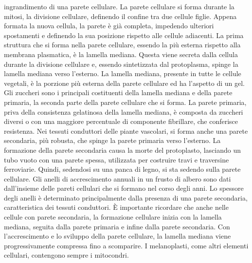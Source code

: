 \documentclass[11pt, a4paper]{article}
\begin{document}
\begin{spacing}{1.15}
ingrandimento di una parete cellulare. La parete cellulare si forma durante la mitosi, la divisione cellulare, definendo il confine tra due cellule figlie. Appena formata la nuova cellula, la parete è già completa, impedendo ulteriori spostamenti e definendo la sua posizione rispetto alle cellule adiacenti. La prima struttura che si forma nella parete cellulare, essendo la più esterna rispetto alla membrana plasmatica, è la lamella mediana. Questa viene secreta dalla cellula durante la divisione cellulare e, essendo sintetizzata dal protoplasma, spinge la lamella mediana verso l'esterno. La lamella mediana, presente in tutte le cellule vegetali, è la porzione più esterna della parete cellulare ed ha l'aspetto di un gel. Gli zuccheri sono i principali costituenti della lamella mediana e della parete primaria, la seconda parte della parete cellulare che si forma. La parete primaria, priva della consistenza gelatinosa della lamella mediana, è composta da zuccheri diversi o con una maggiore percentuale di componente fibrillare, che conferisce resistenza. Nei tessuti conduttori delle piante vascolari, si forma anche una parete secondaria, più robusta, che spinge la parete primaria verso l'esterno. La formazione della parete secondaria causa la morte del protoplasto, lasciando un tubo vuoto con una parete spessa, utilizzata per costruire travi e traversine ferroviarie. Quindi, sedendosi su una panca di legno, si sta sedendo sulla parete cellulare. Gli anelli di accrescimento annuali in un frusto di albero sono dati dall'insieme delle pareti cellulari che si formano nel corso degli anni. Lo spessore degli anelli è determinato principalmente dalla presenza di una parete secondaria, caratteristica dei tessuti conduttori. È importante ricordare che anche nelle cellule con parete secondaria, la formazione cellulare inizia con la lamella mediana, seguita dalla parete primaria e infine dalla parete secondaria. Con l'accrescimento e lo sviluppo della parete cellulare, la lamella mediana viene progressivamente compressa fino a scomparire. I melanoplasti, come altri elementi cellulari, contengono sempre i mitocondri.
\end{spacing}
\end{document}
